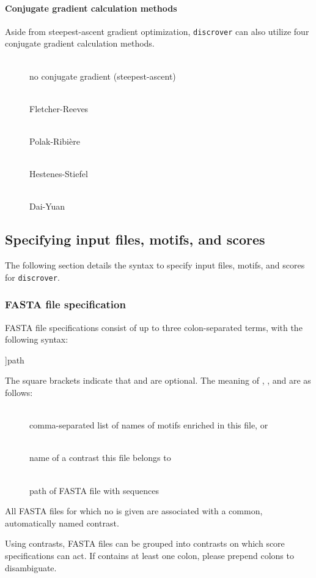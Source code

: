 \documentclass[a4paper]{article}
\newcommand{\discrover}[0]{\texttt{discrover}}
\begin{document}
\newcommand{\Item}[1]{\item[#1] \hfill \\}

\paragraph{Conjugate gradient calculation methods}
Aside from steepest-ascent gradient optimization, \discrover{} can also utilize four conjugate gradient calculation methods.
\begin{description}
  \Item{}
    no conjugate gradient (steepest-ascent)
  \Item{}
    Fletcher-Reeves
  \Item{}
    Polak-Ribi\`ere
  \Item{}
    Hestenes-Stiefel
  \Item{}
    Dai-Yuan
\end{description}

\subsection{Specifying input files, motifs, and scores}
\label{section:specification}
The following section details the syntax to specify input files, motifs, and scores for \discrover{}.

\subsubsection{FASTA file specification}
FASTA file specifications consist of up to three colon-separated terms, with the following syntax:

\begin{verbbox}
[names:[contrast:]]path
\end{verbbox}
\fbox{\theverbbox[t]}

The square brackets indicate that  and  are optional.
The meaning of , , and  are as follows:

\begin{description}
 \Item{}
   comma-separated list of names of motifs enriched in this file, or 
 \Item{}
   name of a contrast this file belongs to
 \Item{}
   path of FASTA file with sequences
\end{description}

All FASTA files for which no  is given are associated with a common, automatically named contrast.

Using contrasts, FASTA files can be grouped into contrasts on which score specifications can act.
If  contains at least one colon, please prepend colons to disambiguate.
\end{document}
